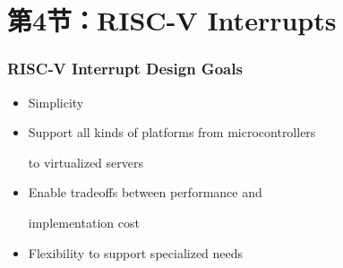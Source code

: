 \section{第4节：RISC-V Interrupts} %
\begin{frame}[fragile]
    \frametitle{RISC‐V Interrupt Design Goals}
    \begin{itemize}
    \item Simplicity
    \item Support	
 all	
 kinds	
 of	
 platforms	
 from	
 microcontrollers	
  
    to	
 virtualized	
 servers
    \item Enable	
 tradeoffs	
 between	
 performance	
 and	
  
    implementation	
 cost	
  
    \item Flexibility	
 to	
 support	
 specialized	
 needs	
      
\end{itemize}
\end{frame}
% 
% 
% 
